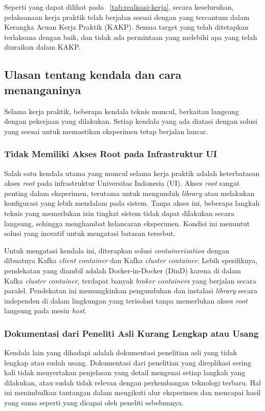Seperti yang dapat dilihat pada \tab~\ref{tab:realisasi-kerja}, secara keseluruhan, pelaksanaan kerja praktik telah berjalan sesuai dengan yang tercantum dalam Kerangka Acuan Kerja Praktik (KAKP). Semua target yang telah ditetapkan terlaksana dengan baik, dan tidak ada permintaan yang melebihi apa yang telah diuraikan dalam KAKP.

\subsection{Ulasan tentang kendala dan cara menanganinya}

Selama kerja praktik, beberapa kendala teknis muncul, berkaitan langsung dengan pekerjaan yang dilakukan. Setiap kendala yang ada diatasi dengan solusi yang sesuai untuk memastikan eksperimen tetap berjalan lancar.

\subsubsection{Tidak Memiliki Akses Root pada Infrastruktur UI}

Salah satu kendala utama yang muncul selama kerja praktik adalah keterbatasan akses \textit{root} pada infrastruktur Universitas Indonesia (UI). Akses \textit{root} sangat penting dalam eksperimen, terutama untuk mengunduh \textit{library} atau melakukan konfigurasi yang lebih mendalam pada sistem. Tanpa akses ini, beberapa langkah teknis yang memerlukan izin tingkat sistem tidak dapat dilakukan secara langsung, sehingga menghambat kelancaran eksperimen. Kondisi ini menuntut solusi yang inovatif untuk mengatasi batasan tersebut.

Untuk mengatasi kendala ini, diterapkan solusi \textit{containerization} dengan dibuatnya Kafka \textit{client container} dan Kafka \textit{cluster container}. Lebih spesifiknya, pendekatan yang diambil adalah Docker-in-Docker (DinD) karena di dalam Kafka \textit{cluster container}, terdapat banyak \textit{broker containers} yang berjalan secara paralel. Pendekatan ini memungkinkan pengunduhan dan instalasi \textit{library} secara independen di dalam lingkungan yang terisolasi tanpa memerlukan akses \textit{root} langsung pada mesin \textit{host}.

\subsubsection{Dokumentasi dari Peneliti Asli Kurang Lengkap atau Usang}

Kendala lain yang dihadapi adalah dokumentasi penelitian asli yang tidak lengkap atau sudah usang. Dokumentasi dari penelitian yang direplikasi sering kali tidak menyertakan penjelasan yang detail mengenai setiap langkah yang dilakukan, atau sudah tidak relevan dengan perkembangan teknologi terbaru. Hal ini menimbulkan tantangan dalam mengikuti alur eksperimen dan mencapai hasil yang sama seperti yang dicapai oleh peneliti sebelumnya.

